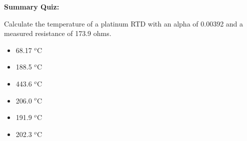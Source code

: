 \noindent
{\bf Summary Quiz:}

Calculate the temperature of a platinum RTD with an alpha of 0.00392 and a measured resistance of 173.9 ohms.

\begin{itemize}
\item{} 68.17 $^{o}$C 
\vskip 5pt 
\item{} 188.5 $^{o}$C
\vskip 5pt 
\item{} 443.6 $^{o}$C
\vskip 5pt 
\item{} 206.0 $^{o}$C 
\vskip 5pt 
\item{} 191.9 $^{o}$C 
\vskip 5pt 
\item{} 202.3 $^{o}$C 
\end{itemize}




